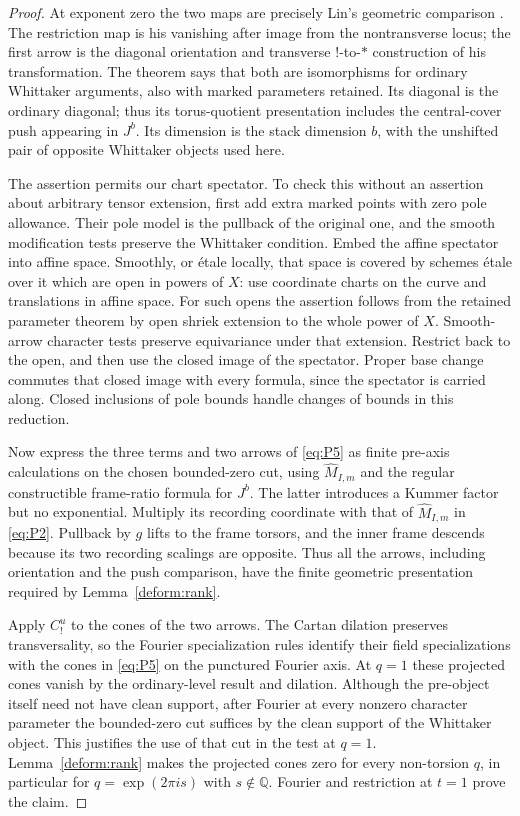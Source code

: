 \documentclass[11pt]{article}
\numberwithin{equation}{section}
\theoremstyle{definition}
\theoremstyle{remark}
\begin{document}
\begin{proof}
At exponent zero the two maps are precisely Lin's
geometric comparison
\cite[Propositions~2.2.4--2.2.5, Section~2.2.6,
Section~8.1.3 and Proposition~8.1.4, Theorem~9.0.2]{Lin}.
The restriction map is his vanishing after image from
the nontransverse locus; the first arrow is the diagonal
orientation and transverse $!$-to-$*$ construction of
his transformation.  The theorem says that both are
isomorphisms for ordinary Whittaker arguments, also with
marked parameters retained.  Its diagonal is the
ordinary diagonal; thus its torus-quotient presentation
includes the central-cover push appearing in $J^b$.
Its dimension is the stack dimension $b$, with the
unshifted pair of opposite Whittaker objects used here.

The assertion permits our chart spectator.  To check
this without an assertion about arbitrary tensor
extension, first add extra marked points with zero
pole allowance.  Their pole model is the pullback of
the original one, and the smooth modification tests
preserve the Whittaker condition.  Embed the affine
spectator into affine space.  Smoothly, or \'etale
locally, that space is covered by schemes \'etale over
it which are open in powers of $X$: use coordinate
charts on the curve and translations in affine space.
For such opens the assertion follows from the retained
parameter theorem by open shriek extension to the
whole power of $X$.  Smooth-arrow character tests
preserve equivariance under that extension.  Restrict
back to the open, and then use the closed image of
the spectator.  Proper base change commutes that
closed image with every formula, since the spectator
is carried along.  Closed inclusions of pole bounds
handle changes of bounds in this reduction.

Now express the three terms and two arrows of
\eqref{eq:P5} as finite pre-axis calculations on the
chosen bounded-zero cut, using
$\widehat M_{I,m}$ and the regular constructible
frame-ratio formula for $J^b$.  The latter introduces
a Kummer factor but no exponential.  Multiply its
recording coordinate with that of
$\widehat M_{I,m}$ in \eqref{eq:P2}.  Pullback by $g$
lifts to the frame torsors, and the inner frame
descends because its two recording scalings are
opposite.  Thus all the arrows, including orientation
and the push comparison, have the finite geometric
presentation required by Lemma~\ref{deform:rank}.

Apply $C_!^u$ to the cones of the two arrows.  The
Cartan dilation preserves transversality, so the
Fourier specialization rules identify their field
specializations with the cones in \eqref{eq:P5} on
the punctured Fourier axis.  At $q=1$ these projected
cones vanish by the ordinary-level result and
dilation.  Although the pre-object itself need not
have clean support, after Fourier at every nonzero
character parameter the bounded-zero cut suffices
by the clean support of the Whittaker object.  This
justifies the use of that cut in the test at $q=1$.
Lemma~\ref{deform:rank} makes the projected cones
zero for every non-torsion $q$, in particular for
$q=\exp(2\pi i s)$ with $s\notin\mathbb Q$.
Fourier and restriction at $t=1$ prove the claim.


\end{proof}
\end{document}
